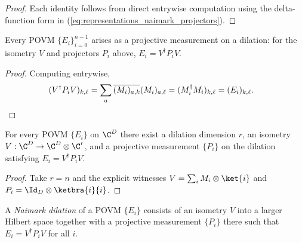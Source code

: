 \begin{proof}
    \leanok
    Each identity follows from direct entrywise computation using the
    delta-function form in (\ref{eq:representations_naimark_projectors}).
\end{proof}

\begin{theorem}\label{thm:naimark_recovers_povm}
    \leanok
    Every POVM $\{E_i\}_{i=0}^{n-1}$ arises as a projective measurement on a
    dilation: for the isometry $V$ and projectors $P_i$ above,
    $E_i=V^\dagger P_iV$.
\end{theorem}

\begin{proof}
    \leanok
    Computing entrywise,
    \begin{align}
        (V^\dagger P_iV)_{k,\ell}
        &=\sum_a\overline{(M_i)_{a,k}}(M_i)_{a,\ell}
          =(M_i^\dagger M_i)_{k,\ell}
          =(E_i)_{k,\ell}.
        \notag
    \end{align}
\end{proof}

\begin{theorem}\label{thm:exists_naimark_dilation}
    \leanok
    For every POVM $\{E_i\}$ on $\C^D$ there exist a dilation dimension $r$,
    an isometry $V:\C^D\to\C^D\otimes\C^r$, and a projective
    measurement $\{P_i\}$ on the dilation satisfying $E_i=V^\dagger P_iV$.
\end{theorem}

\begin{proof}
    \leanok
    Take $r=n$ and the explicit witnesses $V=\sum_iM_i\otimes\ket{i}$
    and $P_i=\Id_D\otimes\ketbra{i}{i}$.
\end{proof}

\begin{definition}
    \label{def:is_naimark_dilation}
    \leanok
    A \emph{Naimark dilation} of a POVM $\{E_i\}$ consists of an isometry
    $V$ into a larger Hilbert space together with a projective measurement
    $\{P_i\}$ there such that $E_i=V^\dagger P_iV$ for all $i$.
\end{definition}

